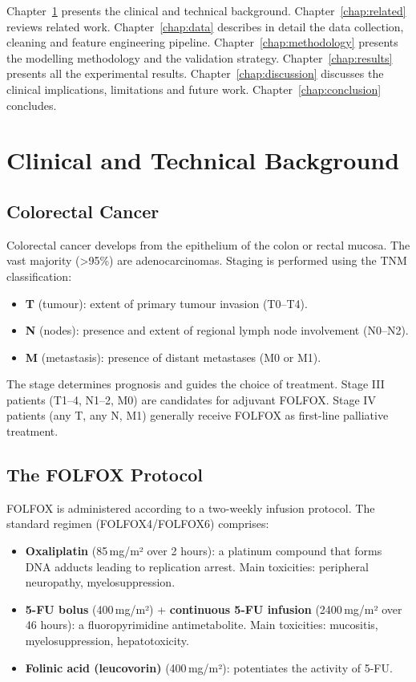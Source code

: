 \documentclass[12pt,a4paper]{report}
\begin{document}
Chapter~\ref{chap:background} presents the clinical and technical background. Chapter~\ref{chap:related} reviews related work. Chapter~\ref{chap:data} describes in detail the data collection, cleaning and feature engineering pipeline. Chapter~\ref{chap:methodology} presents the modelling methodology and the validation strategy. Chapter~\ref{chap:results} presents all the experimental results. Chapter~\ref{chap:discussion} discusses the clinical implications, limitations and future work. Chapter~\ref{chap:conclusion} concludes.

\chapter{Clinical and Technical Background}
\label{chap:background}

\section{Colorectal Cancer}

Colorectal cancer develops from the epithelium of the colon or rectal mucosa. The vast majority (>95\%) are adenocarcinomas. Staging is performed using the TNM classification:
\begin{itemize}
  \item \textbf{T} (tumour): extent of primary tumour invasion (T0--T4).
  \item \textbf{N} (nodes): presence and extent of regional lymph node involvement (N0--N2).
  \item \textbf{M} (metastasis): presence of distant metastases (M0 or M1).
\end{itemize}
The stage determines prognosis and guides the choice of treatment. Stage III patients (T1--4, N1--2, M0) are candidates for adjuvant FOLFOX. Stage IV patients (any T, any N, M1) generally receive FOLFOX as first-line palliative treatment.

\section{The FOLFOX Protocol}

FOLFOX is administered according to a two-weekly infusion protocol. The standard regimen (FOLFOX4/FOLFOX6) comprises:
\begin{itemize}
  \item \textbf{Oxaliplatin} (85\,mg/m² over 2 hours): a platinum compound that forms DNA adducts leading to replication arrest. Main toxicities: peripheral neuropathy, myelosuppression.
  \item \textbf{5-FU bolus} (400\,mg/m²) + \textbf{continuous 5-FU infusion} (2400\,mg/m² over 46 hours): a fluoropyrimidine antimetabolite. Main toxicities: mucositis, myelosuppression, hepatotoxicity.
  \item \textbf{Folinic acid (leucovorin)} (400\,mg/m²): potentiates the activity of 5-FU.
\end{itemize}
\end{document}
